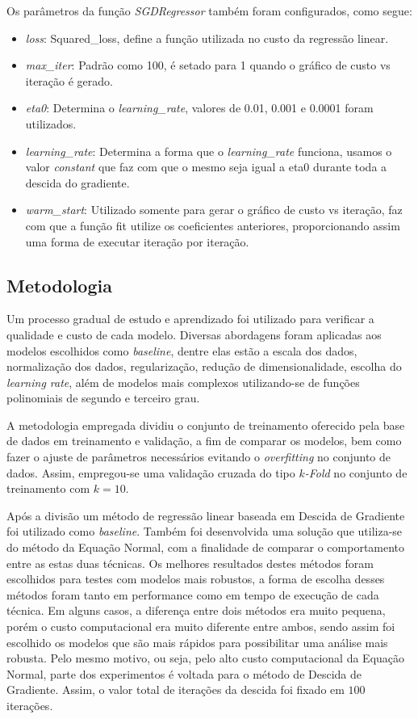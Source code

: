 \documentclass[conference]{IEEEtran}
\begin{document}
Os parâmetros da função \emph{SGDRegressor} também foram configurados, como segue:
\begin{itemize}
	\item \textit{loss}: Squared\_loss, define a função utilizada no custo da regressão linear.
	\item \textit{max\_iter}: Padrão como 100, é setado para 1 quando o gráfico de custo vs iteração é gerado.
	\item \textit{eta0}: Determina o \emph{learning\_rate}, valores de 0.01, 0.001 e 0.0001 foram utilizados.
	\item \textit{learning\_rate}: Determina a forma que o \emph{learning\_rate} funciona, usamos o valor \emph{constant} que faz com que o mesmo seja igual a eta0 durante toda a descida do gradiente.
	\item \textit{warm\_start}: Utilizado somente para gerar o gráfico de custo vs iteração, faz com que a função fit utilize os coeficientes anteriores, proporcionando assim uma forma de executar iteração por iteração.
\end{itemize}

\subsection{Metodologia} \label{sec:metodologia}

Um processo gradual de estudo e aprendizado foi utilizado para verificar a qualidade e custo de cada modelo.  Diversas abordagens foram aplicadas aos modelos escolhidos como \textit{baseline}, dentre elas estão a escala dos dados, normalização dos dados, regularização, redução de dimensionalidade, escolha do \emph{learning rate}, além de modelos mais complexos utilizando-se de funções polinomiais de segundo e terceiro grau.

A metodologia empregada dividiu o conjunto de treinamento oferecido pela base de dados em treinamento e validação, a fim de comparar os modelos, bem como fazer o ajuste de parâmetros necessários evitando o \textit{overfitting} no conjunto de dados. Assim, empregou-se uma validação cruzada do tipo \textit{$k$-Fold} no conjunto de treinamento com $k=10$.

Após a divisão um método de regressão linear baseada em Descida de Gradiente foi utilizado como \emph{baseline}. Também foi desenvolvida uma solução que utiliza-se do método da Equação Normal, com a finalidade de comparar o comportamento entre as estas duas técnicas.  Os melhores resultados destes métodos foram escolhidos para testes com modelos mais robustos, a forma de escolha desses métodos foram tanto em performance como em tempo de execução de cada técnica. Em alguns casos, a diferença entre dois métodos era muito pequena, porém o custo computacional era muito diferente entre ambos, sendo assim foi escolhido os modelos que são mais rápidos para possibilitar uma análise mais robusta. Pelo mesmo motivo, ou seja, pelo alto custo computacional da Equação Normal, parte dos experimentos é voltada para o método de Descida de Gradiente. Assim, o valor total de iterações da descida foi fixado em $100$ iterações.
\end{document}
